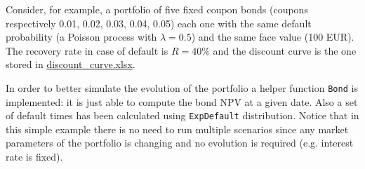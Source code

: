 Consider, for example, a portfolio of five fixed coupon bonds (coupons respectively 0.01, 0.02, 0.03, 0.04, 0.05) each one with the same default probability (a Poisson process with $\lambda=0.5$) and the same face value (100 EUR). The recovery rate in case of default is $R=40\%$ and the discount curve is the one stored in \href{https://github.com/matteosan1/finance_course/raw/master/input_files/discount_factors_2022-10-05.xlsx}{discount\_curve.xlsx}.

In order to better simulate the evolution of the portfolio a helper function \texttt{Bond} is implemented: it is just able to compute the bond NPV at a given date. Also a set of default times has been calculated using \texttt{ExpDefault} distribution.
Notice that in this simple example there is no need to run multiple scenarios since any market parameters of the portfolio is changing and no evolution is required (e.g. interest rate is fixed).
 
